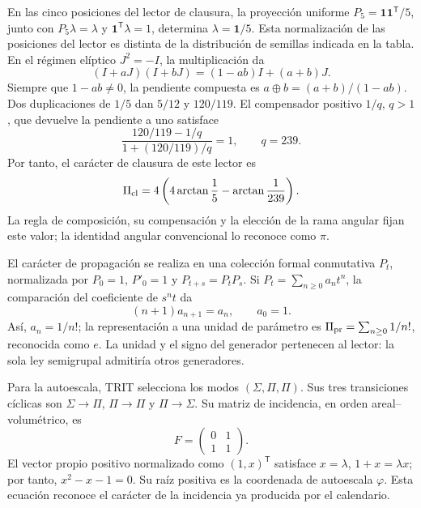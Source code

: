 En las cinco posiciones del lector de clausura, la proyección uniforme
\(P_5=\mathbf1\mathbf1^{\mathsf T}/5\), junto con
\(P_5\lambda=\lambda\) y \(\mathbf1^{\mathsf T}\lambda=1\), determina
\(\lambda=\mathbf1/5\). Esta normalización de las posiciones del lector
es distinta de la distribución de semillas indicada en la tabla.
En el régimen elíptico \(J^2=-I\), la multiplicación da
\[
(I+aJ)(I+bJ)=(1-ab)I+(a+b)J.
\]
Siempre que \(1-ab\ne0\), la pendiente compuesta es
\(a\oplus b=(a+b)/(1-ab)\). Dos duplicaciones de \(1/5\) dan
\(5/12\) y \(120/119\). El compensador positivo \(1/q\), \(q>1\),
que devuelve la pendiente a uno satisface
\[
\frac{120/119-1/q}{1+(120/119)/q}=1,
\qquad q=239.
\]
Por tanto, el carácter de clausura de este lector es
\begin{equation}
 \Pi_{\rm cl}=4\left(4\arctan\frac15-\arctan\frac1{239}\right).
 \label{vi:dep:lector-clausura}
\end{equation}
La regla de composición, su compensación y la elección de la rama angular
fijan este valor; la identidad angular convencional lo reconoce como \(\pi\).

El carácter de propagación se realiza en una colección formal conmutativa
\(P_t\), normalizada por \(P_0=1\), \(P'_0=1\) y
\(P_{t+s}=P_tP_s\). Si \(P_t=\sum_{n\ge0}a_nt^n\), la comparación
del coeficiente de \(s^nt\) da
\[
 (n+1)a_{n+1}=a_n,\qquad a_0=1.
\]
Así, \(a_n=1/n!\); la representación a una unidad de parámetro es
\(\Pi_{\rm pr}=\sum_{n\ge0}1/n!\), reconocida como \(e\).
La unidad y el signo del generador pertenecen al lector: la sola ley
semigrupal admitiría otros generadores.

Para la autoescala, TRIT selecciona los modos
\((\Sigma,\Pi,\Pi)\). Sus tres transiciones cíclicas son
\(\Sigma\to\Pi\), \(\Pi\to\Pi\) y \(\Pi\to\Sigma\). Su matriz
de incidencia, en orden areal--volumétrico, es
\begin{equation}
 F=\begin{pmatrix}0&1\\1&1\end{pmatrix}.
 \label{vi:dep:incidencia-hojas}
\end{equation}
El vector propio positivo normalizado como \((1,x)^{\mathsf T}\)
satisface \(x=\lambda\), \(1+x=\lambda x\); por tanto,
\(x^2-x-1=0\). Su raíz positiva es la coordenada de autoescala
\(\varphi\). Esta ecuación reconoce el carácter de la incidencia ya
producida por el calendario.

